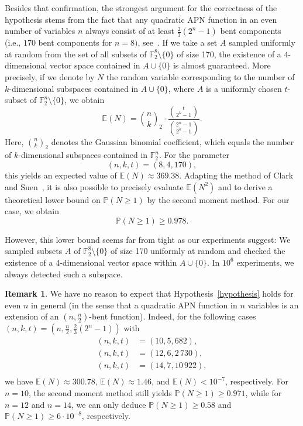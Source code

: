 \documentclass{amsart}[11pt]
\theoremstyle{plain}
\theoremstyle{definition}
\newtheorem{remark}[theorem]{Remark}
\numberwithin{theorem}{section}
\numberwithin{equation}{section}
\numberwithin{table}{section}
\numberwithin{figure}{section}
\numberwithin{algorithm}{section}
\def\F{\mathbb F}
\begin{document}
Besides that confirmation, the strongest argument for the correctness of the hypothesis stems from the fact that any quadratic APN function in an even number of variables $n$ always consist of at least $\frac{2}{3}(2^n-1)$ bent components (i.e., $170$ bent components for $n=8)$, see~\cite[Section 4.2]{DBLP:conf/fse/Nyberg94}. If we take a set $A$  sampled uniformly at random from the set of all subsets of $\mathbb{F}_2^8 \setminus \{0\}$ of size 170, the existence of a $4$-dimensional vector space contained in $A \cup \{0\}$ is almost guaranteed. More precisely, if we denote by $N$ the random variable corresponding to the number of $k$-dimensional subspaces contained in $A \cup \{0\}$, where $A$ is a uniformly chosen $t$-subset of $\mathbb{F}_2^n \setminus \{0\}$, we obtain
\[\mathbb{E}(N) = \binom{n}{k}_2 \cdot \frac{\binom{t}{2^k-1}}{\binom{2^n-1}{2^k-1}}.\]
Here, $\binom{n}{k}_2$ denotes the Gaussian binomial coefficient, which equals the number of $k$-dimensional subspaces contained in $\mathbb{F}_2^n$. For the parameter $$(n,k,t) = (8,4,170),$$ this yields an expected value of $\mathbb{E}(N) \approx 369.38$. Adapting the method of Clark and Suen~\cite{clark1999probability}, it is also possible to precisely evaluate $\mathbb{E}(N^2)$ and to derive a theoretical lower bound on $\mathbb{P}(N \geq 1)$ by the second moment method. For our case, we obtain  \[\mathbb{P}(N \geq 1) \geq 0.978.\]

However, this lower bound seems far from tight as our experiments suggest: We sampled subsets $A$ of $\F_2^8 \setminus \{0\}$ of size 170 uniformly at random and checked the existence of a 4-dimensional vector space  within $A \cup \{0\}$. In $10^6$ experiments, we always detected such a subspace.

\begin{remark}
    We have no reason to expect that Hypothesis~\ref{hypothesis} holds for even $n$ in general (in the sense that a quadratic APN function in  $n$ variables is an extension of an $(n,\frac{n}{2})$-bent function). Indeed, for the following cases $(n,k,t)=(n,\frac{n}{2},\frac{2}{3}(2^n-1))$ with
    \begin{equation*}
    	\begin{split}
    		(n,k,t)& = (10,5,682), \\
    		(n,k,t)&= (12,6,2\,730), \\
    		(n,k,t)&= (14,7,10\,922), \\
    	\end{split}
    \end{equation*}
     we have $\mathbb{E}(N) \approx 300.78$, $\mathbb{E}(N) \approx 1.46$, and $\mathbb{E}(N) < 10^{-7}$, respectively. For $n = 10$, the second moment method still yields $\mathbb{P}(N \geq 1) \geq 0.971$, while for $n=12$ and $n=14$, we can only deduce $\mathbb{P}(N \geq 1) \geq 0.58$ and $\mathbb{P}(N \geq 1) \geq 6 \cdot 10^{-8}$, respectively.
\end{remark}
\end{document}
